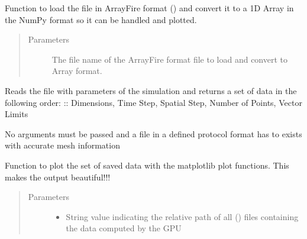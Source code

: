 \documentclass[letterpaper,10pt,english]{sphinxmanual}
\begin{document}
\begin{fulllineitems}
\begin{quote}
\begin{description}
\end{description}\end{quote}

\begin{fulllineitems}
\label{\detokenize{index:Loader.meshPlot.load_envelope}}
Function to load the file in ArrayFire format () and convert it to
a 1D Array in the NumPy format so it can be handled and plotted.
\begin{quote}\begin{description}
\item[{Parameters}] \leavevmode
{} \textendash{} The file name of the ArrayFire format file to load and convert to  Array format.

\end{description}\end{quote}

\end{fulllineitems}


\begin{fulllineitems}
\label{\detokenize{index:Loader.meshPlot.load_parameters}}
Reads the file with parameters of the simulation and returns a set
of data in the following order:
:: Dimensions, Time Step, Spatial Step, Number of Points, Vector Limits

No arguments must be passed and a file  in a defined protocol format has to exists with accurate mesh information

\end{fulllineitems}


\begin{fulllineitems}
\label{\detokenize{index:Loader.meshPlot.plot_sequence}}
Function to plot the set of saved data with the matplotlib
plot functions. This makes the output beautiful!!!
\begin{quote}\begin{description}
\item[{Parameters}] \leavevmode\begin{itemize}
\item {} 
 \textendash{} String value indicating the relative path of all  () files containing the data computed by the GPU


\end{itemize}
\end{description}
\end{quote}
\end{fulllineitems}
\end{fulllineitems}
\end{document}

